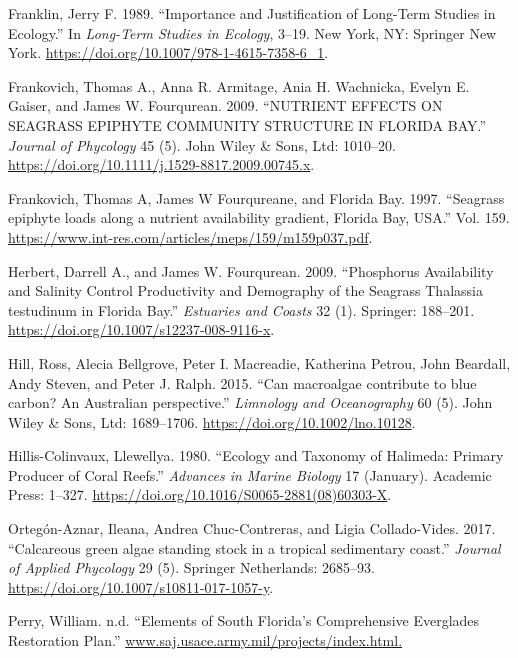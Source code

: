 \documentclass[]{article}
\begin{document}
\leavevmode\hypertarget{ref-Franklin1989}{}%
Franklin, Jerry F. 1989. ``Importance and Justification of Long-Term
Studies in Ecology.'' In \emph{Long-Term Studies in Ecology}, 3--19. New
York, NY: Springer New York.
\url{https://doi.org/10.1007/978-1-4615-7358-6_1}.

\leavevmode\hypertarget{ref-Frankovich2009}{}%
Frankovich, Thomas A., Anna R. Armitage, Ania H. Wachnicka, Evelyn E.
Gaiser, and James W. Fourqurean. 2009. ``NUTRIENT EFFECTS ON SEAGRASS
EPIPHYTE COMMUNITY STRUCTURE IN FLORIDA BAY.'' \emph{Journal of
Phycology} 45 (5). John Wiley \& Sons, Ltd: 1010--20.
\url{https://doi.org/10.1111/j.1529-8817.2009.00745.x}.

\leavevmode\hypertarget{ref-Frankovich1997}{}%
Frankovich, Thomas A, James W Fourqureane, and Florida Bay. 1997.
``Seagrass epiphyte loads along a nutrient availability gradient,
Florida Bay, USA.'' Vol. 159.
\url{https://www.int-res.com/articles/meps/159/m159p037.pdf}.

\leavevmode\hypertarget{ref-Herbert2009}{}%
Herbert, Darrell A., and James W. Fourqurean. 2009. ``Phosphorus
Availability and Salinity Control Productivity and Demography of the
Seagrass Thalassia testudinum in Florida Bay.'' \emph{Estuaries and
Coasts} 32 (1). Springer: 188--201.
\url{https://doi.org/10.1007/s12237-008-9116-x}.

\leavevmode\hypertarget{ref-Hill2015}{}%
Hill, Ross, Alecia Bellgrove, Peter I. Macreadie, Katherina Petrou, John
Beardall, Andy Steven, and Peter J. Ralph. 2015. ``Can macroalgae
contribute to blue carbon? An Australian perspective.'' \emph{Limnology
and Oceanography} 60 (5). John Wiley \& Sons, Ltd: 1689--1706.
\url{https://doi.org/10.1002/lno.10128}.

\leavevmode\hypertarget{ref-Hillis-Colinvaux1980}{}%
Hillis-Colinvaux, Llewellya. 1980. ``Ecology and Taxonomy of Halimeda:
Primary Producer of Coral Reefs.'' \emph{Advances in Marine Biology} 17
(January). Academic Press: 1--327.
\url{https://doi.org/10.1016/S0065-2881(08)60303-X}.

\leavevmode\hypertarget{ref-Ortegon-Aznar2017}{}%
Ortegón-Aznar, Ileana, Andrea Chuc-Contreras, and Ligia Collado-Vides.
2017. ``Calcareous green algae standing stock in a tropical sedimentary
coast.'' \emph{Journal of Applied Phycology} 29 (5). Springer
Netherlands: 2685--93. \url{https://doi.org/10.1007/s10811-017-1057-y}.

\leavevmode\hypertarget{ref-Perry}{}%
Perry, William. n.d. ``Elements of South Florida's Comprehensive
Everglades Restoration Plan.''
\url{www.saj.usace.army.mil/projects/index.html.}
\end{document}
